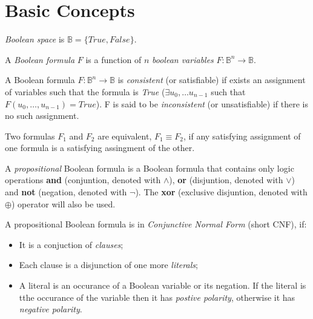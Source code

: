\chapter{Basic Concepts}

\begin{mydef}
  \emph{Boolean space} is $\mathbb{B} = \{ True, False \}$.
\end{mydef}

\begin{mydef}
  A \emph{Boolean formula} $F$ is a function of $n$ \emph{boolean variables}
  $F : \mathbb{B}^n \rightarrow \mathbb{B}$.
\end{mydef}

\begin{mydef}
  A Boolean formula $F : \mathbb{B}^n \rightarrow \mathbb{B}$ is
  \emph{consistent} (or satisfiable) if exists an assignment of
  variables such that the formula is \emph{True}
  ($\exists u_0, \ldots u_{n-1}$ such that $F(u_0, \ldots, u_{n-1}) = True$).
  F is said to be \emph{inconsistent} (or unsatisfiable) if
  there is no such assignment.
\end{mydef}

\begin{mydef}
  Two formulas $F_1$ and $F_2$ are equivalent, $F_1 \equiv F_2$, if
  any satisfying assignment of one formula is a satisfying assingment
  of the other.
\end{mydef}

\begin{mydef}
  A \emph{propositional} Boolean formula is a Boolean formula that contains only
  logic operations \textbf{and} (conjuntion, denoted with $\land$),
  \textbf{or} (disjuntion, denoted with $\lor$) and \textbf{not}
  (negation, denoted with $\neg$). The \textbf{xor} (exclusive
  disjuntion, denoted with $\oplus$) operator will also be used.
\end{mydef}

A propositional Boolean formula is in \emph{Conjunctive Normal Form}
(short CNF), if:
\begin{itemize}
  \item It is a conjuction of \emph{clauses};

  \item Each clause is a disjunction of one more \emph{literals};

  \item A literal is an occurance of a Boolean variable or its negation.
  If the literal is tthe occurance of the variable
  then it has \emph{postive polarity}, otherwise it has \emph{negative
  polarity}.

\end{itemize}


